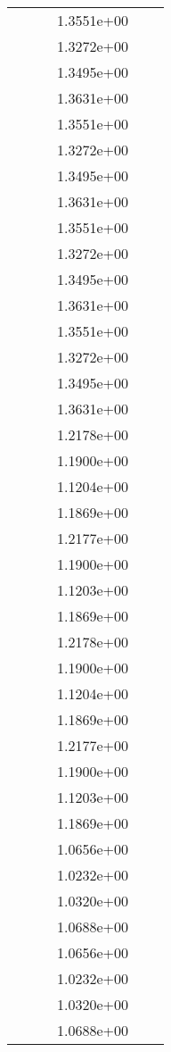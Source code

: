 \begin{xltabular}{\textwidth}{r|rS[table-format=1.3e+2]S[table-format=1.4e+2]S[table-format=1.4e+2]S[table-format=-1.5]}
&  &  & 1.3551e+00 & & \\
&  &  & 1.3272e+00 & & \\
&  &  & 1.3495e+00 & & \\
&  &  & 1.3631e+00 & & \\
&  &  & 1.3551e+00 & & \\
&  &  & 1.3272e+00 & & \\
&  &  & 1.3495e+00 & & \\
&  &  & 1.3631e+00 & & \\
&  &  & 1.3551e+00 & & \\
&  &  & 1.3272e+00 & & \\
&  &  & 1.3495e+00 & & \\
&  &  & 1.3631e+00 & & \\
&  &  & 1.3551e+00 & & \\
&  &  & 1.3272e+00 & & \\
&  &  & 1.3495e+00 & & \\
&  &  & 1.3631e+00 & & \\
&  &  & 1.2178e+00 & & \\
&  &  & 1.1900e+00 & & \\
&  &  & 1.1204e+00 & & \\
&  &  & 1.1869e+00 & & \\
&  &  & 1.2177e+00 & & \\
&  &  & 1.1900e+00 & & \\
&  &  & 1.1203e+00 & & \\
&  &  & 1.1869e+00 & & \\
&  &  & 1.2178e+00 & & \\
&  &  & 1.1900e+00 & & \\
&  &  & 1.1204e+00 & & \\
&  &  & 1.1869e+00 & & \\
&  &  & 1.2177e+00 & & \\
&  &  & 1.1900e+00 & & \\
&  &  & 1.1203e+00 & & \\
&  &  & 1.1869e+00 & & \\
&  &  & 1.0656e+00 & & \\
&  &  & 1.0232e+00 & & \\
&  &  & 1.0320e+00 & & \\
&  &  & 1.0688e+00 & & \\
&  &  & 1.0656e+00 & & \\
&  &  & 1.0232e+00 & & \\
&  &  & 1.0320e+00 & & \\
&  &  & 1.0688e+00 & & \\

\end{xltabular}
